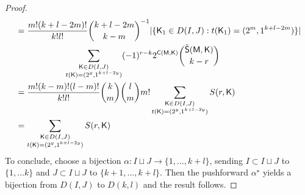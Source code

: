 \documentclass[11pt, a4paper, oneside, reqno]{amsart}
\newcommand{\sK}{{\sf K}}
\newcommand{\setK}{{D(I,J)}}
\newcommand{\partitionskl}{{D(k,l)}}
\newcommand{\sM}{{\sf M}}
\theoremstyle{remark}
\theoremstyle{definition}
\numberwithin{equation}{section}
\begin{document}
\begin{proof}
	\begin{align*}
		 & = \frac{m!(k+l-2m)!}{k!l!}\binom{k+l-2m}{k-m}^{-1}|\{ {\sK_1} \in \setK : t(\sK_1)=(2^m, 1^{k+l-2m})\}| \\
		 & \hspace{2cm}\sum_{\substack{{\sK} \in \setK                                                         \\  {t({\sK})}=(2^y,1^{k+l-2y})}}(-1)^{r-k}2^{{\sf C}(\sM,{\sK})} \binom{\tilde{{\sf S}}({\sM},{\sK})}{k-r} \\
		 & = \frac{m!(k-m)!(l-m)!}{k!l!} \binom{k}{m}\binom{l}{m}m! \sum_{\substack{{\sK} \in \setK             \\  {t({\sK})}=(2^y,1^{k+l-2y})}}S(r,{\sK}) \\
		 & = \sum_{\substack{{\sK} \in \setK                                                                    \\  {t({\sK})}=(2^y,1^{k+l-2y})}}S(r,{\sK})
	\end{align*}
	To conclude, choose a bijection $\alpha : I \sqcup J \to \{1,\ldots,k+l\}$, sending $I \subset I\sqcup J$ to $\{1,\ldots k\}$ and $J \subset I \sqcup J$ to $\{k+1,\ldots,k+l\}$. Then the pushforward $\alpha^{\star}$ yields a bijection from $\setK$ to $\partitionskl$ and the result follows.
\end{proof}
\end{document}
